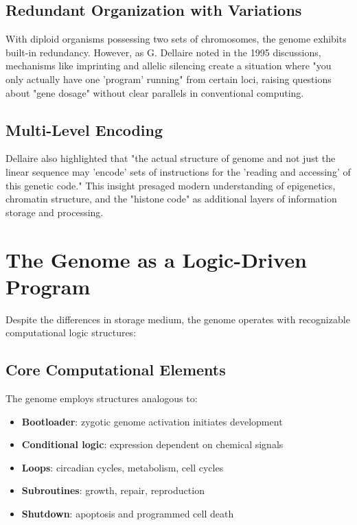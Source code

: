 \documentclass[11pt]{article}
\begin{document}
\subsection{Redundant Organization with Variations}

With diploid organisms possessing two sets of chromosomes, the genome exhibits built-in redundancy. However, as G. Dellaire noted in the 1995 discussions, mechanisms like imprinting and allelic silencing create a situation where "you only actually have one 'program' running" from certain loci, raising questions about "gene dosage" without clear parallels in conventional computing.

\subsection{Multi-Level Encoding}

Dellaire also highlighted that "the actual structure of genome and not just the linear sequence may 'encode' sets of instructions for the 'reading and accessing' of this genetic code." This insight presaged modern understanding of epigenetics, chromatin structure, and the "histone code" as additional layers of information storage and processing.

\section{The Genome as a Logic-Driven Program}

Despite the differences in storage medium, the genome operates with recognizable computational logic structures:

\subsection{Core Computational Elements}

The genome employs structures analogous to:

\begin{itemize}
\item \textbf{Bootloader}: zygotic genome activation initiates development
\item \textbf{Conditional logic}: expression dependent on chemical signals
\item \textbf{Loops}: circadian cycles, metabolism, cell cycles
\item \textbf{Subroutines}: growth, repair, reproduction
\item \textbf{Shutdown}: apoptosis and programmed cell death
\end{itemize}
\end{document}
